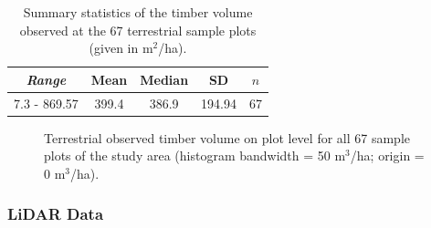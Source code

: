 \begin{table}[H]
	\begin{center}
		\caption{Summary  statistics  of  the  timber  volume  observed  at  the  67  terrestrial sample plots (given in m$^2$/ha).}
		\vspace{0.2cm}
		\label{tab:sumfplots}
		\begin{tabular}{|c|c|c|c|c|}
			\hline
			\multicolumn{1}{|c|}{\textit{Range}} & \multicolumn{1}{c|}{\textbf{Mean}}  & \multicolumn{1}{c|}{\textbf{Median}}  & \multicolumn{1}{c|}{\textbf{SD}}  & \multicolumn{1}{c|}{\textbf{$n$}} \\ %
			\hline \hline
			7.3 - 869.57 & 399.4 & 386.9 & 194.94 & 67 \\ 
			\hline \hline
		\end{tabular} 
	\end{center}
\end{table}

\begin{figure}[H]
	\centering
	\caption{Terrestrial observed timber volume on plot level for all 67 sample plots of the study area (histogram bandwidth = 50 m$^3$/ha; origin = 0 m$^3$/ha).}
	\label{fig:sumfplots}
\end{figure}




\subsubsection{LiDAR Data}
\label{sec:lidardata}

